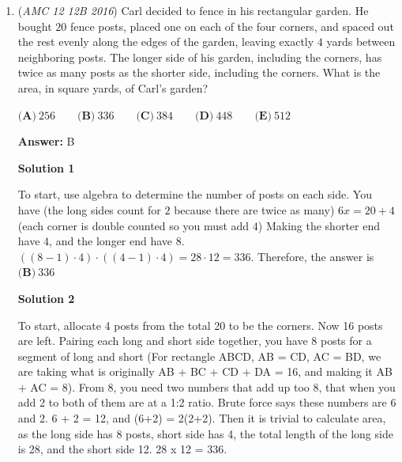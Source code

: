 \begin{enumerate}
 However, since density and thickness are the same and $A$ is proportional to $s^2$ (recognizing that the area of an equilateral triangle is $\frac{(s)^2\sqrt{3}}{4}$), we can say that $m$ is proportional to $s^2$. 

 Then, by increasing s by a factor of $\frac{5}{3}$, $s^2$ is increased by a factor of $\frac{25}{9}$, thus $m=12*\frac{25}{9}$ or $\boxed{\textbf{(D)}\ 33.3}$.

 


	\item (\textit{AMC 12 12B 2016}) Carl decided to fence in his rectangular garden. He bought $20$ fence posts, placed one on each of the four corners, and spaced out the rest evenly along the edges of the garden, leaving exactly $4$ yards between neighboring posts. The longer side of his garden, including the corners, has twice as many posts as the shorter side, including the corners. What is the area, in square yards, of Carl’s garden?


 $\textbf{(A)}\ 256\qquad\textbf{(B)}\ 336\qquad\textbf{(C)}\ 384\qquad\textbf{(D)}\ 448\qquad\textbf{(E)}\ 512$

 \textbf{Answer: }B



\textbf{Solution 1}

To start, use algebra to determine the number of posts on each side. You have (the long sides count for $2$ because there are twice as many) $6x = 20 + 4$ (each corner is double counted so you must add $4$) Making the shorter end have $4$, and the longer end have $8$.  $((8-1) \cdot 4) \cdot ((4-1) \cdot 4) = 28 \cdot 12 = 336$. Therefore, the answer is $\boxed{\textbf{(B)}\ 336}$




\textbf{Solution 2}

To start, allocate 4 posts from the total 20 to be the corners. Now 16 posts are left. Pairing each long and short side together, you have 8 posts for a segment of long and short (For rectangle ABCD, AB = CD, AC = BD, we are taking what is originally AB + BC + CD + DA = 16, and making it AB + AC = 8). From 8, you need two numbers that add up too 8, that when you add 2 to both of them are at a 1:2 ratio. Brute force says these numbers are 6 and 2. 6 + 2 = 12, and (6+2) = 2(2+2). Then it is trivial to calculate area, as the long side has 8 posts, short side has 4, the total length of the long side is 28, and the short side 12. 28 x 12 = 336.

 




\end{enumerate}
